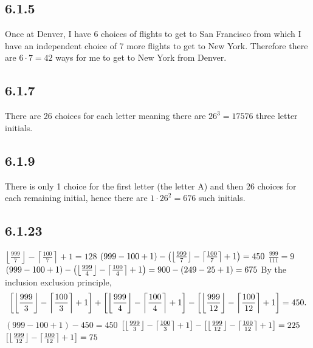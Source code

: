 \documentclass[12pt,titlepage]{extarticle}
\begin{document}
\subsection*{6.1.5}
Once at Denver, I have 6 choices of flights to get to San Francisco from which I have an independent choice of 7 more flights to get to New York. Therefore there are $6 \cdot 7 = 42$ ways for me to get to New York from Denver.

\subsection*{6.1.7}
There are 26 choices for each letter meaning there are $26^3 = 17576$ three letter initials.

\subsection*{6.1.9}
There is only 1 choice for the first letter (the letter A) and then 26 choices for each remaining initial, hence there are $1 \cdot 26^2 = 676$ such initials.

\subsection*{6.1.23}
\begin{tasks}
    \task $\left\lfloor \frac{999}{7} \right\rfloor - \left\lceil \frac{100}{7} \right\rceil + 1 = 128$
    \task $(999 - 100 + 1) - \qty(\left\lfloor \frac{999}{7} \right\rfloor - \left\lceil \frac{100}{7} \right\rceil + 1) = 450$
    \task $\frac{999}{111} = 9$
    \task $(999 - 100 + 1) - \qty(\left\lfloor \frac{999}{4} \right\rfloor - \left\lceil \frac{100}{4} \right\rceil + 1) = 900 - (249 - 25 + 1) = 675$
    \task By the inclusion exclusion principle,
    \[
        \qty[\left\lfloor \frac{999}{3} \right\rfloor - \left\lceil \frac{100}{3} \right\rceil + 1] + \qty[\left\lfloor \frac{999}{4} \right\rfloor - \left\lceil \frac{100}{4} \right\rceil + 1] - \qty[\left\lfloor \frac{999}{12} \right\rfloor - \left\lceil \frac{100}{12} \right\rceil + 1] = 450
    .\]
    \task $(999 - 100 + 1) - 450 = 450$
    \task $\qty[\left\lfloor \frac{999}{3} \right\rfloor - \left\lceil \frac{100}{3} \right\rceil + 1] - \qty[\left\lfloor \frac{999}{12} \right\rfloor - \left\lceil \frac{100}{12} \right\rceil + 1] = 225$
    \task $\qty[\left\lfloor \frac{999}{12} \right\rfloor - \left\lceil \frac{100}{12} \right\rceil + 1] = 75$
\end{tasks}
\end{document}
